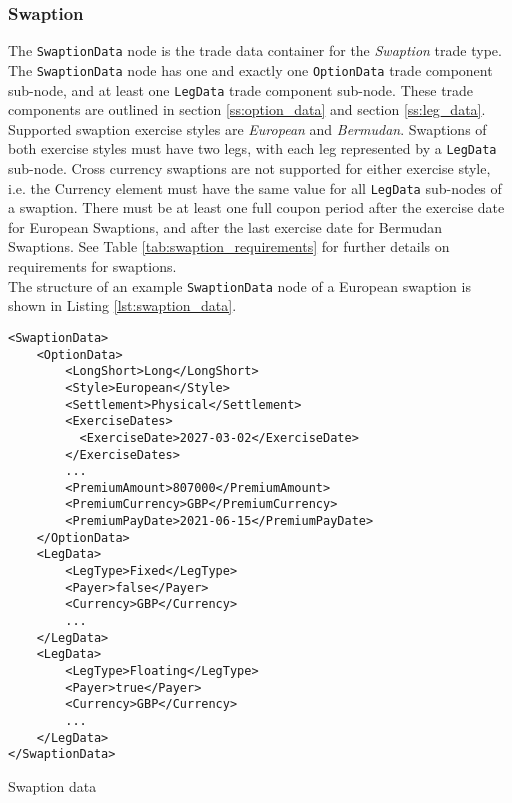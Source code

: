 \subsubsection{Swaption}
\label{ss:swaption} 

The \lstinline!SwaptionData!  node is the trade data container for the \emph{Swaption} trade type. The \lstinline!SwaptionData!
node has one and exactly one \lstinline!OptionData! trade component sub-node, and at least one \lstinline!LegData! trade
component sub-node.  These trade components are outlined in section \ref{ss:option_data} and section
\ref{ss:leg_data}.\\
\vspace{5mm}
Supported swaption exercise styles are \emph{European} and \emph{Bermudan}.  Swaptions of both exercise styles must have two legs, with
each leg represented by a \lstinline!LegData! sub-node.  Cross currency swaptions are not supported for either exercise style, i.e. the Currency element must
have the same value for all \lstinline!LegData! sub-nodes of a swaption. There must be at least one full coupon period after the exercise date for European 
Swaptions, and after the last exercise date for Bermudan Swaptions. See Table \ref{tab:swaption_requirements} for further details on requirements for
 swaptions.\\
\vspace{5mm}
The structure of an example \lstinline!SwaptionData!  node of a European swaption is shown in Listing
\ref{lst:swaption_data}.

\begin{listing}[H]
\begin{verbatim}
<SwaptionData>
    <OptionData>
        <LongShort>Long</LongShort>
        <Style>European</Style>
        <Settlement>Physical</Settlement>
        <ExerciseDates>
          <ExerciseDate>2027-03-02</ExerciseDate>
        </ExerciseDates>
        ...
        <PremiumAmount>807000</PremiumAmount>
        <PremiumCurrency>GBP</PremiumCurrency>
        <PremiumPayDate>2021-06-15</PremiumPayDate>
    </OptionData>
    <LegData>
        <LegType>Fixed</LegType>
        <Payer>false</Payer>    
        <Currency>GBP</Currency>
        ...
    </LegData>
    <LegData>
        <LegType>Floating</LegType>
        <Payer>true</Payer>     
        <Currency>GBP</Currency>
        ...
    </LegData>
</SwaptionData>
\end{verbatim}
\caption{Swaption data}
\label{lst:swaption_data}
\end{listing}

